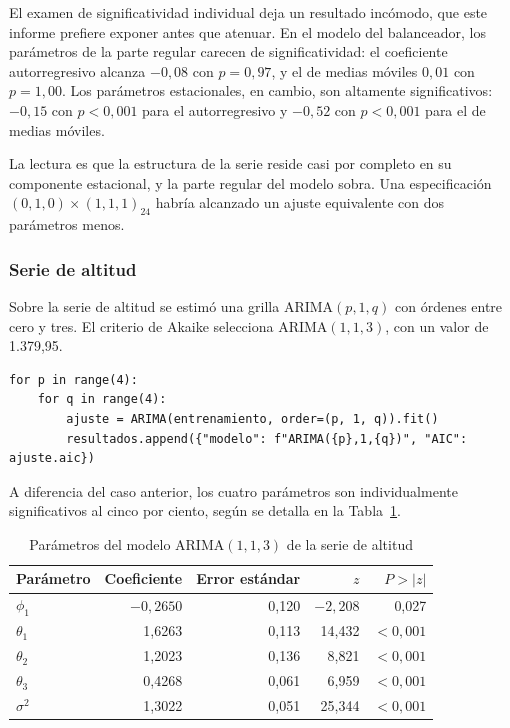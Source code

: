El examen de significatividad individual deja un resultado incómodo, que este informe prefiere
exponer antes que atenuar. En el modelo del balanceador, los parámetros de la parte regular carecen de
significatividad: el coeficiente autorregresivo alcanza $-0{,}08$ con $p = 0{,}97$, y el de
medias móviles $0{,}01$ con $p = 1{,}00$. Los parámetros estacionales, en cambio, son
altamente significativos: $-0{,}15$ con $p < 0{,}001$ para el autorregresivo y $-0{,}52$ con
$p < 0{,}001$ para el de medias móviles.

La lectura es que la estructura de la serie reside casi por completo en su componente
estacional, y la parte regular del modelo sobra. Una especificación
$(0,1,0)\times(1,1,1)_{24}$ habría alcanzado un ajuste equivalente con dos parámetros menos.

\subsubsection{Serie de altitud}

Sobre la serie de altitud se estimó una grilla ARIMA$(p,1,q)$ con órdenes entre cero y tres.
El criterio de Akaike selecciona ARIMA$(1,1,3)$, con un valor de 1.379,95.

\begin{lstlisting}[caption={Grilla de modelos y selección por criterio de información}]
for p in range(4):
    for q in range(4):
        ajuste = ARIMA(entrenamiento, order=(p, 1, q)).fit()
        resultados.append({"modelo": f"ARIMA({p},1,{q})", "AIC": ajuste.aic})
\end{lstlisting}

A diferencia del caso anterior, los cuatro parámetros son individualmente significativos al cinco
por ciento, según se detalla en la Tabla~\ref{tab:uav_params}.

\begin{table}[htbp]
\centering
\caption{Parámetros del modelo ARIMA$(1,1,3)$ de la serie de altitud}
\label{tab:uav_params}
\small
\begin{tabular}{lrrrr}
\toprule
\textbf{Parámetro} & \textbf{Coeficiente} & \textbf{Error estándar} & \textbf{$z$} & \textbf{$P>|z|$} \\
\midrule
$\phi_1$ & $-0{,}2650$ & 0,120 & $-2{,}208$ & 0,027 \\
$\theta_1$ & 1,6263 & 0,113 & 14,432 & $<0{,}001$ \\
$\theta_2$ & 1,2023 & 0,136 & 8,821 & $<0{,}001$ \\
$\theta_3$ & 0,4268 & 0,061 & 6,959 & $<0{,}001$ \\
$\sigma^2$ & 1,3022 & 0,051 & 25,344 & $<0{,}001$ \\
\bottomrule
\end{tabular}
\end{table}

